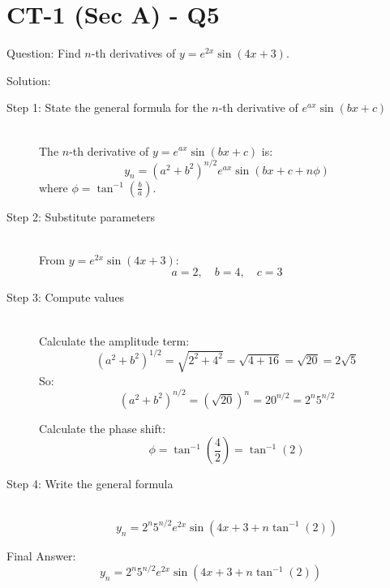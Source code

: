 \documentclass[11pt, a4paper]{article}
\begin{document}

\section*{CT-1 (Sec A) - Q5}

Question:
Find $n$-th derivatives of $y = e^{2x} \sin(4x + 3)$.

Solution:

\begin{description}
    \item[Step 1: State the general formula for the $n$-th derivative of $e^{ax}\sin(bx+c)$] \ \\
    The $n$-th derivative of $y = e^{ax}\sin(bx+c)$ is:
    \[ y_n = (a^2+b^2)^{n/2} e^{ax} \sin(bx+c + n\phi) \]
    where $\phi = \tan^{-1}\left(\frac{b}{a}\right)$.

    \item[Step 2: Substitute parameters] \ \\
    From $y = e^{2x}\sin(4x + 3)$:
    \[ a = 2, \quad b = 4, \quad c = 3 \]

    \item[Step 3: Compute values] \ \\
    Calculate the amplitude term:
    \[ (a^2+b^2)^{1/2} = \sqrt{2^2 + 4^2} = \sqrt{4 + 16} = \sqrt{20} = 2\sqrt{5} \]
    So:
    \[ (a^2+b^2)^{n/2} = (\sqrt{20})^n = 20^{n/2} = 2^n 5^{n/2} \]

    Calculate the phase shift:
    \[ \phi = \tan^{-1}\left(\frac{4}{2}\right) = \tan^{-1}(2) \]

    \item[Step 4: Write the general formula] \ \\
    \[ y_n = 2^n 5^{n/2} e^{2x} \sin\left(4x+3 + n\tan^{-1}(2)\right) \]
\end{description}

Final Answer:
\[ 
\boxed{y_n = 2^n 5^{n/2} e^{2x} \sin\left(4x+3 + n\tan^{-1}(2)\right)} 
\]

\end{document}
